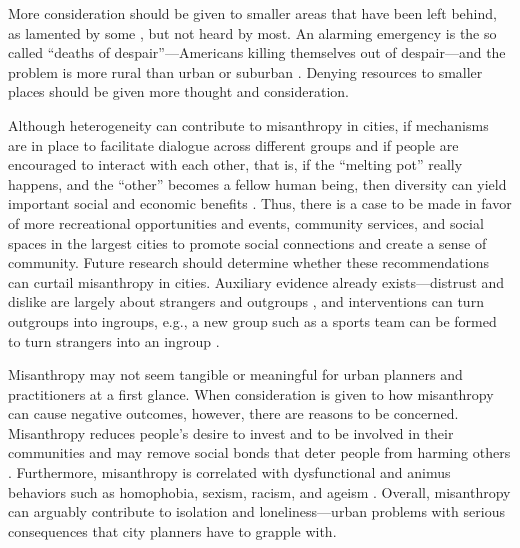 \documentclass[11pt, letterpaper]{article}
\begin{document}
\begin{spacing}{1.4}
 More consideration should be given to smaller areas that have been left behind, as lamented by some
\citep[e.g.,][]{fullerNYT17monD,hansonCityJournalautumn15}, but not heard by
most.
 An alarming emergency is the so called ``deaths of despair''---Americans killing themselves out of despair---and the problem is more rural than urban or suburban \citep{case15,case20}.
Denying resources to smaller places should be given more thought and consideration.
 
Although heterogeneity can contribute to misanthropy in cities, if mechanisms
are in place to facilitate dialogue across different groups and if people are
encouraged to interact with each other, that is, if the ``melting pot'' really
happens, and the ``other'' becomes a fellow human being, then diversity can
yield important social and economic benefits \citep{rodriguez2019does}.  
Thus, there is a case to be made in favor of more recreational opportunities and events, community services, and social spaces in the largest cities to promote social connections and create a sense of community.  Future research should determine whether these recommendations can curtail misanthropy in
cities. Auxiliary evidence already exists---distrust and dislike are largely about strangers and outgroups \citep{wilson85, delhey11}, and interventions can turn outgroups into ingroups, e.g., a new group such as a sports team can be formed to turn strangers into an ingroup  \citep[e.g.,][]{smith10}.
 
Misanthropy may not seem tangible or meaningful for urban planners and practitioners at a first glance.  When consideration is given to how misanthropy can cause negative outcomes, however, there are reasons to be concerned. Misanthropy reduces people's desire to invest and to be involved in their communities and may remove social bonds that deter people from harming others \citep{weaver2006,hirschi1993,fafchamps2006,walters2013}. Furthermore, misanthropy is correlated with dysfunctional and animus behaviors such as
 homophobia, sexism, racism, and ageism \citep{cattacin2006}. Overall, misanthropy can arguably contribute to isolation and loneliness---urban problems with serious consequences that city planners have to grapple with. 
 

\end{spacing}
\end{document}
